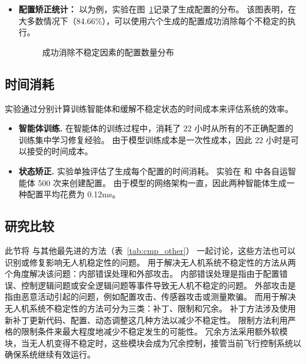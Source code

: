\begin{itemize}



    \item \textbf{配置矫正统计：}
以为例，实验在图~\ref{fig:fix_distribution}记录了生成配置的分布。
该图表明，在大多数情况下（84.66\%），\nyctea  可以使用六个生成的配置成功消除每个不稳定的执行。

\begin{figure}[htb]
\caption{成功消除不稳定因素的配置数量分布}
\label{fig:fix_distribution}
\end{figure}

\end{itemize}


\subsection{时间消耗}
实验通过分别计算训练智能体和缓解不稳定状态的时间成本来评估系统的效率。

\begin{itemize}
    \item \textbf{智能体训练.}
在智能体的训练过程中，\nyctea 消耗了 $22$ 小时从所有的不正确配置的训练集中学习修复经验。 
由于模型训练成本是一次性成本，因此 $22$ 小时是可以接受的时间成本。

    \item \textbf{状态矫正.}
实验单独评估了生成每个配置的时间消耗。
实验在  和  中各自运智能体 500 次来创建配置。
由于模型的网络架构一直，因此两种智能体生成一种配置平均花费为 0.12ms。

\end{itemize}

    

\subsection{研究比较}
此节将 \nyctea 与其他最先进的方法（表~\ref{tab:cmp_other}） 一起讨论，这些方法也可以识别或修复影响无人机稳定性的问题。
用于解决无人机系统不稳定性的方法从两个角度解决该问题：内部错误处理和外部攻击。
内部错误处理是指由于配置错误、控制逻辑问题或安全逻辑问题等事件导致无人机不稳定的问题。
外部攻击是指由恶意活动引起的问题，例如配置攻击、传感器攻击或测量欺骗。
而用于解决无人机系统不稳定性的方法可分为三类：补丁、限制和冗余。
补丁方法涉及使用新补丁更新代码、配置、动态调整这几种方法以减少不稳定性。
限制方法利用严格的限制条件来最大程度地减少不稳定发生的可能性。
冗余方法采用额外软模块，当无人机变得不稳定时，这些模块会成为冗余控制，接管当前飞行控制系统以确保系统继续有效运行。

